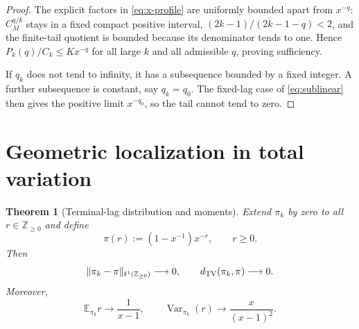 \documentclass[11pt]{article}
\newtheorem{theorem}{Theorem}[section]
\theoremstyle{remark}
\begin{document}
\begin{proof}
The explicit factors in \eqref{eq:x-profile} are uniformly bounded apart from
$x^{-q}$: $C_M^{q/k}$ stays in a fixed compact positive interval,
$(2k-1)/(2k-1-q)<2$, and the finite-tail quotient is bounded because its
denominator tends to one.  Hence $P_k(q)/C_k\le Kx^{-q}$ for all large $k$
and all admissible $q$, proving sufficiency.

If $q_k$ does not tend to infinity, it has a subsequence bounded by a fixed
integer.  A further subsequence is constant, say $q_k=q_0$.  The fixed-lag
case of \eqref{eq:sublinear} then gives the positive limit $x^{-q_0}$, so the
tail cannot tend to zero.
\end{proof}

\section{Geometric localization in total variation}

\begin{theorem}[Terminal-lag distribution and moments]\label{thm:geometric}
Extend $\pi_k$ by zero to all $r\in\mathbb Z_{\ge0}$ and define
\begin{equation}\label{eq:geometric}
 \pi(r):=(1-x^{-1})x^{-r},\qquad r\ge0.
\end{equation}
Then
\begin{equation}\label{eq:l1}
 \|\pi_k-\pi\|_{\ell^1(\mathbb Z_{\ge0})}\longrightarrow0,
 \qquad d_{\rm TV}(\pi_k,\pi)\longrightarrow0.
\end{equation}
Moreover,
\begin{equation}\label{eq:moments}
 \mathbb E_{\pi_k}r\longrightarrow\frac1{x-1},
 \qquad
 \operatorname{Var}_{\pi_k}(r)\longrightarrow\frac{x}{(x-1)^2}.
\end{equation}
\end{theorem}
\end{document}
